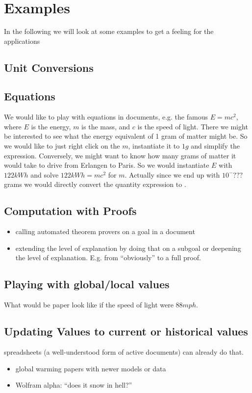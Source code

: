 \section{Examples}
In the following we will look at some examples to get a feeling for the applications
\subsection{Unit Conversions}\label{sec:units}
\subsection{Equations}
We would like to play with equations in documents, e.g. the famous $E=mc^2$, where $E$ is
the energy, $m$ is the mass, and $c$ is the speed of light. There we might be interested
to see what the energy equivalent of 1 gram of matter might be. So we would like to just
right click on the $m$, instantiate it to $1g$ and simplify the expression. Conversely, we
might want to know how many grams of matter it would take to drive from Erlangen to
Paris. So we would instantiate $E$ with $122 kWh$ and solve $122kWh=mc^2$ for
$m$. Actually since we end up with $10^-{???}$ grams we would directly convert the
quantity expression to .

\subsection{Computation with Proofs}
\begin{itemize}
  \item calling automated theorem provers on a goal in a document
  \item extending the level of explanation by doing that on a subgoal or deepening the
    level of explanation. E.g. from ``obviously'' to a full proof.  
  \end{itemize}

\subsection{Playing with global/local values}
What would be paper look like if the speed of light were $88 mph$. 

\subsection{Updating Values to current or historical values}
spreadsheets (a well-understood form of active documents) can already do that. 
\begin{itemize}
\item global warming papers with newer models or data
\item Wolfram alpha: ``does it snow in hell?''
\end{itemize}




